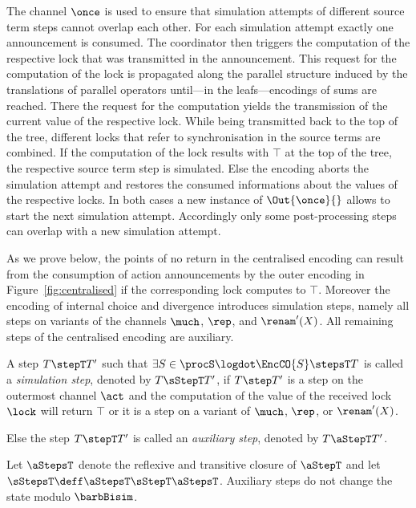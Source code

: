 \documentclass[copyright,creativecommons]{eptcs}
\begin{document}
The channel $ \once $ is used to ensure that simulation attempts of different source term steps cannot overlap each other. For each simulation attempt exactly one announcement is consumed. The coordinator then triggers the computation of the respective lock that was transmitted in the announcement. This request for the computation of the lock is propagated along the parallel structure induced by the translations of parallel operators until---in the leafs---encodings of sums are reached. There the request for the computation yields the transmission of the current value of the respective lock. While being transmitted back to the top of the tree, different locks that refer to synchronisation in the source terms are combined. If the computation of the lock results with $ \top $ at the top of the tree, the respective source term step is simulated. Else the encoding aborts the simulation attempt and restores the consumed informations about the values of the respective locks. In both cases a new instance of $ \Out{\once}{} $ allows to start the next simulation attempt. Accordingly only some post-processing steps can overlap with a new simulation attempt.

As we prove below, the points of no return in the centralised encoding can result from the consumption of action announcements by the outer encoding in Figure~\ref{fig:centralised} if the corresponding lock computes to $ \top $. Moreover the encoding of internal choice and divergence introduces simulation steps, namely all steps on variants of the channels $ \much $, $ \rep $, and $ \renam'(X) $. All remaining steps of the centralised encoding are auxiliary.

\begin{definition}
	A step $ T \stepT T' $ such that $ \exists S \in \procS\logdot \EncCO{S} \stepsT T $ is called a \emph{simulation step}, denoted by $ T \sStepT T' $, if $ T \step T' $ is a step on the outermost channel $ \act $ and the computation of the value of the received lock $ \lock $ will return $ \top $ or it is a step on a variant of $ \much $, $ \rep $, or $ \renam'(X) $.
	
	Else the step $ T \stepT T' $ is called an \emph{auxiliary step}, denoted by $ T \aStepT T' $.
	\label{def:auxStepsCentral}
\end{definition}

\noindent
Let $ \aStepsT $ denote the reflexive and transitive closure of $ \aStepT $ and let $ \sStepsT \deff \aStepsT \sStepT \aStepsT $.
Auxiliary steps do not change the state modulo $ \barbBisim $.
\end{document}
